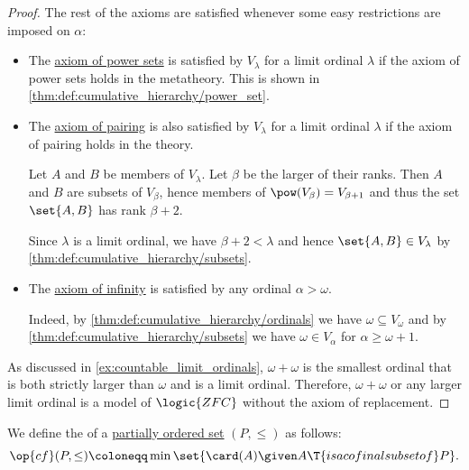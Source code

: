 \begin{proof}
  The rest of the axioms are satisfied whenever some easy restrictions are imposed on \( \alpha \):
  \begin{itemize}
    \item The \hyperref[def:zfc/power_set]{axiom of power sets} is satisfied by \( V_\lambda \) for a limit ordinal \( \lambda \) if the axiom of power sets holds in the metatheory. This is shown in \cref{thm:def:cumulative_hierarchy/power_set}.

    \item The \hyperref[def:zfc/pairing]{axiom of pairing} is also satisfied by \( V_\lambda \) for a limit ordinal \( \lambda \) if the axiom of pairing holds in the theory.

    Let \( A \) and \( B \) be members of \( V_\lambda \). Let \( \beta \) be the larger of their ranks. Then \( A \) and \( B \) are subsets of \( V_\beta \), hence members of \( \pow(V_\beta) = V_{\beta + 1} \) and thus the set \( \set{ A, B } \) has rank \( \beta + 2 \).

    Since \( \lambda \) is a limit ordinal, we have \( \beta + 2 < \lambda \) and hence \( \set{ A, B } \in V_\lambda \) by \cref{thm:def:cumulative_hierarchy/subsets}.

    \item The \hyperref[def:zfc/infinity]{axiom of infinity} is satisfied by any ordinal \( \alpha > \omega \).

    Indeed, by \cref{thm:def:cumulative_hierarchy/ordinals} we have \( \omega \subseteq V_\omega \) and by \cref{thm:def:cumulative_hierarchy/subsets} we have \( \omega \in V_\alpha \) for \( \alpha \geq \omega + 1 \).
  \end{itemize}

  As discussed in \cref{ex:countable_limit_ordinals}, \( \omega + \omega \) is the smallest ordinal that is both strictly larger than \( \omega \) and is a limit ordinal. Therefore, \( \omega + \omega \) or any larger limit ordinal is a model of \( \logic{ZFC} \) without the axiom of replacement.
\end{proof}

\begin{definition}\label{def:cofinality}
  We define the  of a \hyperref[def:partially_ordered_set]{partially ordered set} \( (P, \leq) \) as follows:
  \begin{equation*}
     \op{cf}(P, \leq) \coloneqq \min\set{ \card(A) \given A \T{is a cofinal subset of} P }.
  \end{equation*}
\end{definition}

